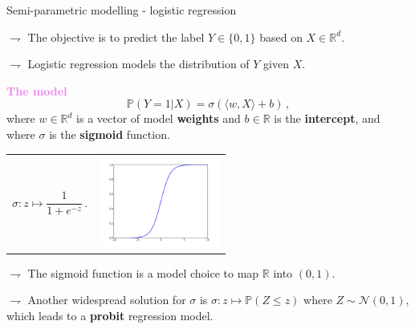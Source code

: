 \documentclass[9pt]{beamer}
\newcommand\R{\mathds{R}}
\renewcommand{\P}{\mathds{P}}
\begin{document}

\begin{frame}{Semi-parametric modelling - logistic regression}


$\rightharpoondown$ The objective is to \alert{predict the  label $Y\in\{0,1\}$} based on $X\in\mathbb{R}^d$.

$\rightharpoondown$ Logistic regression \alert{models the distribution of $Y$ given $X$}.

\vspace{.3cm}

{\bf\textcolor{violet}{The model}} 
\begin{equation*}
\P(Y = 1| X) = \sigma(\langle w,X \rangle + b)\,,
\end{equation*}
where $w \in \R^d$ is a vector of model \textbf{weights} and $b \in \R$ is the \textbf{intercept}, and where $\sigma$ is the \textbf{sigmoid} function.

\vspace{.3cm}
 
\begin{tabular}{cc}
	\begin{minipage}{0.4\textwidth}
		\begin{equation*}
		\sigma: z \mapsto \frac{1}{1 + e^{-z}}\,.
		\end{equation*}%
	\end{minipage}
	&
	\begin{minipage}{0.4\textwidth}
		\includegraphics[width=4cm]{./sigmoid.png}  
	\end{minipage}    
\end{tabular}

$\rightharpoondown$ The sigmoid function is a \alert{model choice to map $\mathbb{R}$ into $(0,1)$}.

$\rightharpoondown$ Another widespread solution for $\sigma$ is $\sigma: z \mapsto  \P( Z \leqslant z)$ where $Z\sim \mathcal{N}(0,1)$, which leads to a \textbf{probit} regression model.

\end{frame}
\end{document}
